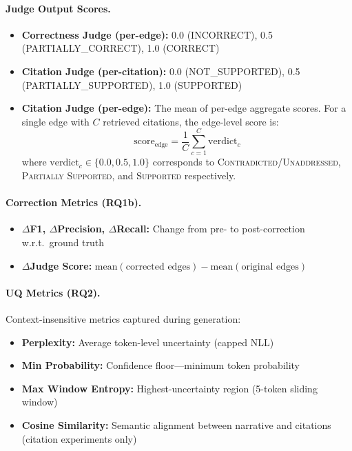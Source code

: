 \paragraph{Judge Output Scores.}
\begin{itemize}[noitemsep]
    \item \textbf{Correctness Judge (per-edge):} 0.0 (INCORRECT), 0.5 (PARTIALLY\_CORRECT), 1.0 (CORRECT)
    \item \textbf{Citation Judge (per-citation):} 0.0 (NOT\_SUPPORTED), 0.5 (PARTIALLY\_SUPPORTED), 1.0 (SUPPORTED)
    \item \textbf{Citation Judge (per-edge):} The mean of per-edge aggregate scores. For a single edge with $C$ retrieved citations, the edge-level score is:
    \begin{equation}
        \text{score}_{\text{edge}} = \frac{1}{C}\sum_{c=1}^{C} \text{verdict}_c
    \end{equation}
    where $\text{verdict}_c \in \{0.0, 0.5, 1.0\}$ corresponds to \textsc{Contradicted}/\textsc{Unaddressed}, \textsc{Partially Supported}, and \textsc{Supported} respectively.
\end{itemize}

\paragraph{Correction Metrics (RQ1b).}
\begin{itemize}[noitemsep]
    \item \textbf{$\Delta$F1, $\Delta$Precision, $\Delta$Recall:} Change from pre- to post-correction w.r.t.\ ground truth
    \item \textbf{$\Delta$Judge Score:} $\text{mean}(\text{corrected edges}) - \text{mean}(\text{original edges})$
\end{itemize}

\paragraph{UQ Metrics (RQ2).}\label{sec:uq_metrics_capping} Context-insensitive metrics captured during generation:
\begin{itemize}[noitemsep]
    \item \textbf{Perplexity:} Average token-level uncertainty (capped NLL)
    \item \textbf{Min Probability:} Confidence floor---minimum token probability
    \item \textbf{Max Window Entropy:} Highest-uncertainty region (5-token sliding window)
    \item \textbf{Cosine Similarity:} Semantic alignment between narrative and citations (citation experiments only)
\end{itemize}

